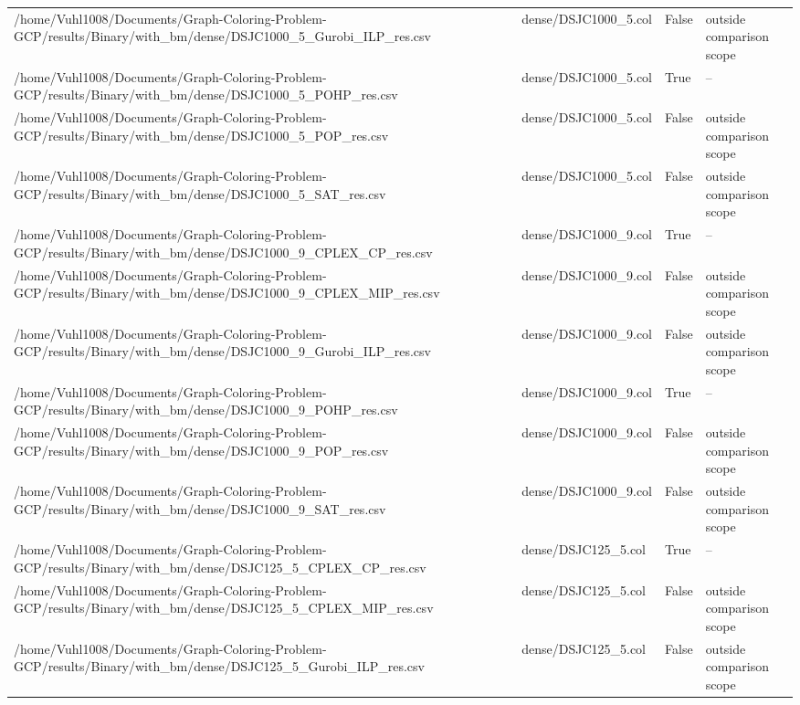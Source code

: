 \begin{table}[htbp]
\begin{tabular}{llll}
/home/Vuhl1008/Documents/Graph-Coloring-Problem-GCP/results/Binary/with\_bm/dense/DSJC1000\_5\_Gurobi\_ILP\_res.csv & dense/DSJC1000\_5.col & False & outside comparison scope \\
/home/Vuhl1008/Documents/Graph-Coloring-Problem-GCP/results/Binary/with\_bm/dense/DSJC1000\_5\_POHP\_res.csv & dense/DSJC1000\_5.col & True & -- \\
/home/Vuhl1008/Documents/Graph-Coloring-Problem-GCP/results/Binary/with\_bm/dense/DSJC1000\_5\_POP\_res.csv & dense/DSJC1000\_5.col & False & outside comparison scope \\
/home/Vuhl1008/Documents/Graph-Coloring-Problem-GCP/results/Binary/with\_bm/dense/DSJC1000\_5\_SAT\_res.csv & dense/DSJC1000\_5.col & False & outside comparison scope \\
/home/Vuhl1008/Documents/Graph-Coloring-Problem-GCP/results/Binary/with\_bm/dense/DSJC1000\_9\_CPLEX\_CP\_res.csv & dense/DSJC1000\_9.col & True & -- \\
/home/Vuhl1008/Documents/Graph-Coloring-Problem-GCP/results/Binary/with\_bm/dense/DSJC1000\_9\_CPLEX\_MIP\_res.csv & dense/DSJC1000\_9.col & False & outside comparison scope \\
/home/Vuhl1008/Documents/Graph-Coloring-Problem-GCP/results/Binary/with\_bm/dense/DSJC1000\_9\_Gurobi\_ILP\_res.csv & dense/DSJC1000\_9.col & False & outside comparison scope \\
/home/Vuhl1008/Documents/Graph-Coloring-Problem-GCP/results/Binary/with\_bm/dense/DSJC1000\_9\_POHP\_res.csv & dense/DSJC1000\_9.col & True & -- \\
/home/Vuhl1008/Documents/Graph-Coloring-Problem-GCP/results/Binary/with\_bm/dense/DSJC1000\_9\_POP\_res.csv & dense/DSJC1000\_9.col & False & outside comparison scope \\
/home/Vuhl1008/Documents/Graph-Coloring-Problem-GCP/results/Binary/with\_bm/dense/DSJC1000\_9\_SAT\_res.csv & dense/DSJC1000\_9.col & False & outside comparison scope \\
/home/Vuhl1008/Documents/Graph-Coloring-Problem-GCP/results/Binary/with\_bm/dense/DSJC125\_5\_CPLEX\_CP\_res.csv & dense/DSJC125\_5.col & True & -- \\
/home/Vuhl1008/Documents/Graph-Coloring-Problem-GCP/results/Binary/with\_bm/dense/DSJC125\_5\_CPLEX\_MIP\_res.csv & dense/DSJC125\_5.col & False & outside comparison scope \\
/home/Vuhl1008/Documents/Graph-Coloring-Problem-GCP/results/Binary/with\_bm/dense/DSJC125\_5\_Gurobi\_ILP\_res.csv & dense/DSJC125\_5.col & False & outside comparison scope \\

\end{tabular}
\end{table}
